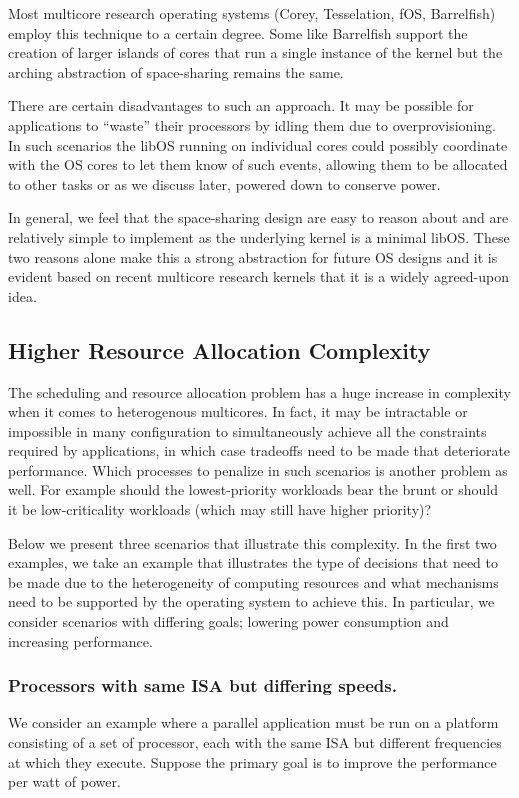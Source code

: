Most multicore research operating systems (\eg Corey, Tesselation, fOS, Barrelfish)
employ this technique to a certain degree. Some like Barrelfish support the creation
of larger islands of cores that run a single instance of the kernel but the arching
abstraction of space-sharing remains the same.

There are certain disadvantages to such an approach. It may be possible for applications to ``waste'' their processors by idling them due to overprovisioning. In such scenarios the libOS running on individual cores could possibly coordinate with the OS cores to let them know of such events, allowing them to be allocated to other tasks or as we discuss later, powered down to conserve power.

In general, we feel that the space-sharing design are easy to reason about and are relatively simple to implement as the underlying kernel is a minimal libOS. These two reasons alone make this a strong abstraction for future OS designs and it is evident based on recent multicore research kernels that it is a widely agreed-upon idea.

\subsection{Higher Resource Allocation Complexity}

The scheduling and resource allocation problem has a huge increase in complexity when it comes to heterogenous multicores. In fact, it may be intractable or impossible in many configuration to simultaneously achieve all the constraints required by applications, in which case tradeoffs need to be made that deteriorate performance. Which processes to penalize in such scenarios is another problem as well. For example should the lowest-priority workloads bear the brunt or should it be low-criticality workloads (which may still have higher priority)?

Below we present three scenarios that illustrate this complexity. In the first two examples, we take an example that illustrates the type of decisions that need to be made due to the heterogeneity of computing resources and what mechanisms need to be supported by the operating system to achieve this. In particular, we consider scenarios with differing goals; lowering power consumption and increasing performance.

\subsubsection{Processors with same ISA but differing speeds.}
We consider an example where a parallel application must be run on a platform consisting of a set of processor, each with the same ISA but different frequencies at which they execute. Suppose the primary goal is to improve the performance per watt of power.

